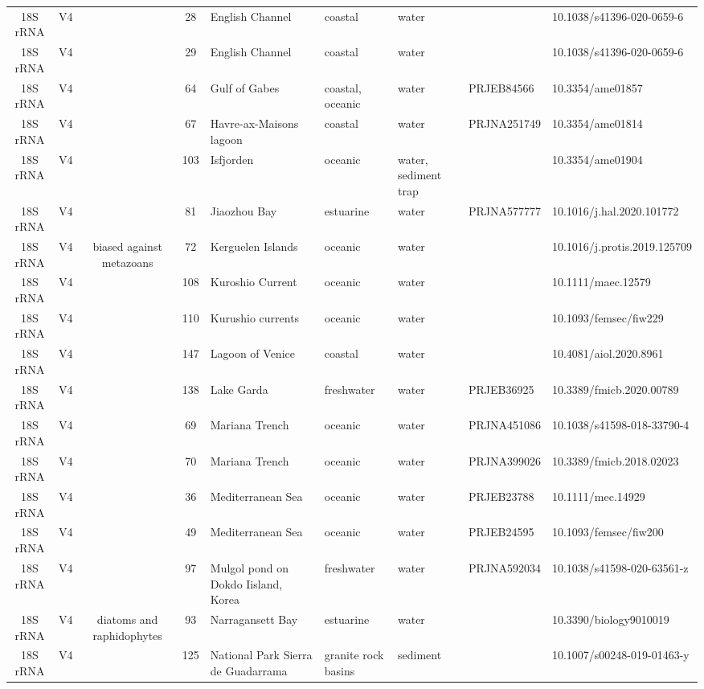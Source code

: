 \begin{longtable}{cccclllll}
  18S rRNA & V4 &  & 28 & English Channel & coastal & water &  & 10.1038/s41396-020-0659-6 \\ 
  18S rRNA & V4 &  & 29 & English Channel & coastal & water &  & 10.1038/s41396-020-0659-6 \\ 
  18S rRNA & V4 &  & 64 & Gulf of Gabes & coastal, oceanic & water & PRJEB84566 & 10.3354/ame01857 \\ 
  18S rRNA & V4 &  & 67 & Havre-ax-Maisons lagoon & coastal & water & PRJNA251749 & 10.3354/ame01814 \\ 
  18S rRNA & V4 &  & 103 & Isfjorden & oceanic & water, sediment trap &  & 10.3354/ame01904 \\ 
  18S rRNA & V4 &  & 81 & Jiaozhou Bay & estuarine & water & PRJNA577777 & 10.1016/j.hal.2020.101772 \\ 
  18S rRNA & V4 & biased against metazoans & 72 & Kerguelen Islands & oceanic & water &  & 10.1016/j.protis.2019.125709 \\ 
  18S rRNA & V4 &  & 108 & Kuroshio Current & oceanic & water &  & 10.1111/maec.12579 \\ 
  18S rRNA & V4 &  & 110 & Kurushio currents & oceanic & water &  & 10.1093/femsec/fiw229 \\ 
  18S rRNA & V4 &  & 147 & Lagoon of Venice & coastal & water &  & 10.4081/aiol.2020.8961 \\ 
  18S rRNA & V4 &  & 138 & Lake Garda & freshwater & water & PRJEB36925 & 10.3389/fmicb.2020.00789 \\ 
  18S rRNA & V4 &  & 69 & Mariana Trench & oceanic & water & PRJNA451086 & 10.1038/s41598-018-33790-4 \\ 
  18S rRNA & V4 &  & 70 & Mariana Trench & oceanic & water & PRJNA399026 & 10.3389/fmicb.2018.02023 \\ 
  18S rRNA & V4 &  & 36 & Mediterranean Sea & oceanic & water & PRJEB23788 & 10.1111/mec.14929 \\ 
  18S rRNA & V4 &  & 49 & Mediterranean Sea & oceanic & water & PRJEB24595 & 10.1093/femsec/fiw200 \\ 
  18S rRNA & V4 &  & 97 & Mulgol pond on Dokdo Iisland, Korea & freshwater & water & PRJNA592034 & 10.1038/s41598-020-63561-z \\ 
  18S rRNA & V4 & diatoms and raphidophytes & 93 & Narragansett Bay & estuarine & water &  & 10.3390/biology9010019 \\ 
  18S rRNA & V4 &  & 125 & National Park Sierra de Guadarrama & granite rock basins & sediment &  & 10.1007/s00248-019-01463-y \\ 

\end{longtable}
